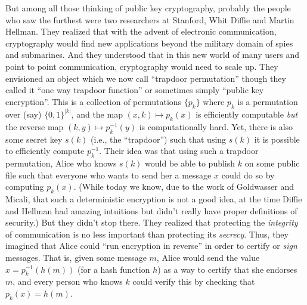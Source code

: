 But among all those thinking of public key cryptography, probably the
people who saw the furthest were two researchers at Stanford, Whit
Diffie and Martin Hellman. They realized that with the advent of
electronic communication, cryptography would find new applications
beyond the military domain of spies and submarines. And they understood
that in this new world of many users and point to point communication,
cryptography would need to scale up. They envisioned an object which we
now call ``trapdoor permutation'' though they called it ``one way
trapdoor function'' or sometimes simply ``public key encryption''. This
is a collection of permutations \(\{ p_k \}\) where \(p_k\) is a
permutation over (say) \(\{0,1\}^{|k|}\), and the map
\((x,k)\mapsto p_k(x)\) is efficiently computable \emph{but} the reverse
map \((k,y) \mapsto p_k^{-1}(y)\) is computationally hard. Yet, there is
also some secret key \(s(k)\) (i.e., the ``trapdoor'') such that using
\(s(k)\) it is possible to efficiently compute \(p^{-1}_k\). Their idea
was that using such a trapdoor permutation, Alice who knows \(s(k)\)
would be able to publish \(k\) on some public file such that everyone
who wants to send her a message \(x\) could do so by computing
\(p_k(x)\). (While today we know, due to the work of Goldwasser and
Micali, that such a deterministic encryption is not a good idea, at the
time Diffie and Hellman had amazing intuitions but didn't really have
proper definitions of security.) But they didn't stop there. They
realized that protecting the \emph{integrity} of communication is no
less important than protecting its \emph{secrecy}. Thus, they imagined
that Alice could ``run encryption in reverse'' in order to certify or
\emph{sign} messages. That is, given some message \(m\), Alice would
send the value \(x=p_k^{-1}(h(m))\) (for a hash function \(h\)) as a way
to certify that she endorses \(m\), and every person who knows \(k\)
could verify this by checking that \(p_k(x)=h(m)\).


